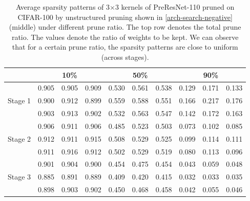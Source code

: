 \setlength{\tabcolsep}{5pt}
\renewcommand{\arraystretch}{1.2}
\begin{table}[!htbp]
\centering
\small
\begin{tabular}{c|ccc|ccc|ccc}
\hline
                         & \multicolumn{3}{c|}{10\%} & \multicolumn{3}{c|}{50\%} & \multicolumn{3}{c}{90\%} \\ \hline
\multirow{3}{*}{Stage 1} & 0.905   & 0.905  & 0.909  & 0.530   & 0.561  & 0.538  & 0.129  & 0.171  & 0.133  \\
                         & 0.900   & 0.912  & 0.899  & 0.559   & 0.588  & 0.551  & 0.166  & 0.217  & 0.176  \\
                         & 0.903   & 0.913  & 0.902  & 0.532   & 0.563  & 0.547  & 0.142  & 0.172  & 0.163  \\ \hline
\multirow{3}{*}{Stage 2} & 0.906   & 0.911  & 0.906  & 0.485   & 0.523  & 0.503  & 0.073  & 0.102  & 0.085  \\
                         & 0.912   & 0.911  & 0.915  & 0.508   & 0.529  & 0.525  & 0.099  & 0.114  & 0.111  \\
                         & 0.911   & 0.916  & 0.912  & 0.502   & 0.529  & 0.519  & 0.080  & 0.113  & 0.096  \\ \hline
\multirow{3}{*}{Stage 3} & 0.901   & 0.904  & 0.900  & 0.454   & 0.475  & 0.454  & 0.043  & 0.059  & 0.048  \\
                         & 0.885   & 0.891  & 0.889  & 0.409   & 0.420  & 0.415  & 0.032  & 0.033  & 0.035  \\
                         & 0.898   & 0.903  & 0.902  & 0.450   & 0.468  & 0.458  & 0.042  & 0.055  & 0.046  \\ \hline
\end{tabular}
\vspace{1ex}
  \caption{
      Average sparsity patterns of 3$\times$3 kernels of PreResNet-110 pruned on CIFAR-100 by unstructured pruning shown in \autoref{arch-search-negative} (middle) under different prune ratio. The top row denotes the total prune ratio. The values denote the ratio of weights to be kept. We can observe that for a certain prune ratio, the sparsity patterns are close to uniform (across stages).}
\label{sparsity-6}
\vspace{-2ex}
\end{table}


